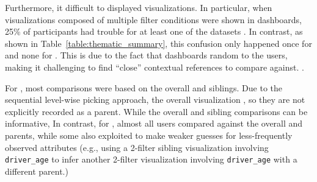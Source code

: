 \par Furthermore,  it difficult to  displayed visualizations. In particular, when visualizations composed of multiple filter conditions were shown in \cluster dashboards, 25\% of  participants had trouble  for at least one of the datasets . In contrast, as shown in Table~\ref{table:thematic_summary}, this confusion only happened once for \BFS and none for \system. This is due to the fact that \cluster dashboards  random to the users, making it challenging to find ``close'' contextual references to compare against.
. %
\par For \BFS, most comparisons were based on the overall  and siblings. Due to the sequential level-wise picking approach, the overall visualization , so they are not explicitly recorded as a parent. While the overall and sibling comparisons can be informative,  In contrast, for \system, almost all users compared against the overall  and parents, while some also exploited  to make weaker guesses for less-frequently observed attributes (e.g., using a 2-filter sibling visualization involving \texttt{driver\_age} to infer another 2-filter visualization involving \texttt{driver\_age} with a different parent.)

